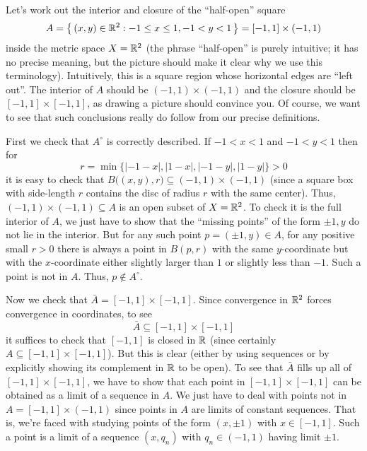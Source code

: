 \begin{example}
  Let's work out the interior and closure of the ``half-open'' square
  \[
    A=\bigl\{\,(x,y)\in\mathbb{R}^2:-1\leq x\leq
    1,-1<y<1\,\bigr\}=[-1,1]\times(-1,1)
  \]
  inside the metric space \(X=\mathbb{R}^2\) (the phrase ``half-open'' is purely
  intuitive; it has no precise meaning, but the picture should make it
  clear why we use this terminology). Intuitively, this is a square region
  whose horizontal edges are ``left out''. The interior of \(A\) should be
  \((-1,1)\times(-1,1)\) and the closure should be \([-1,1]\times[-1,1]\),
  as drawing a picture should convince you. Of course, we want to see that
  such conclusions really do follow from our precise definitions.

  First we check that \(A^\circ\) is correctly described. If \(-1<x<1\) and
  \(-1<y<1\) then for
  \[
    r=\min\bigl\{|-1-x|,|1-x|,|-1-y|,|1-y|\bigr\}>0
  \]
  it is easy to check that
  \(B\bigl((x,y),r\bigr)\subseteq(-1,1)\times(-1,1)\) (since a square box
  with side-length \(r\) contains the disc of radius \(r\) with the same
  center). Thus, \((-1,1)\times(-1,1)\subseteq A\) is an open subset of
  \(X=\mathbb{R}^2\). To check it is the full interior of \(A\), we just have to
  show that the ``missing points'' of the form \(\pm 1,y\) do not lie in
  the interior. But for any such point \(p=(\pm 1,y)\in A\), for any
  positive small \(r>0\) there is always a point in \(B(p,r)\) with the
  same \(y\)-coordinate but with the \(x\)-coordinate either slightly
  larger than \(1\) or slightly less than \(-1\). Such a point is not in
  \(A\). Thus, \(p\notin A^\circ\).

  Now we check that \(\bar A=[-1,1]\times[-1,1]\). Since convergence in
  \(\mathbb{R}^2\) forces convergence in coordinates, to see
  \[
    \bar A\subseteq[-1,1]\times[-1,1]
  \]
  it suffices to check that \([-1,1]\) is closed in \(\mathbb{R}\) (since
  certainly \(A\subseteq[-1,1]\times[-1,1]\)). But this is clear (either by
  using sequences or by explicitly showing its complement in \(\mathbb{R}\) to be
  open). To see that \(\bar A\) fills up all of \([-1,1]\times[-1,1]\), we
  have to show that each point in \([-1,1]\times[-1,1]\) can be obtained as
  a limit of a sequence in \(A\). We just have to deal with points not in
  \(A=[-1,1]\times(-1,1)\) since points in \(A\) are limits of constant
  sequences. That is, we're faced with studying points of the form \((x,\pm
  1)\) with \(x\in [-1,1]\). Such a point is a limit of a sequence
  \((x,q_n)\) with \(q_n\in(-1,1)\) having limit \(\pm 1\).
\end{example}
